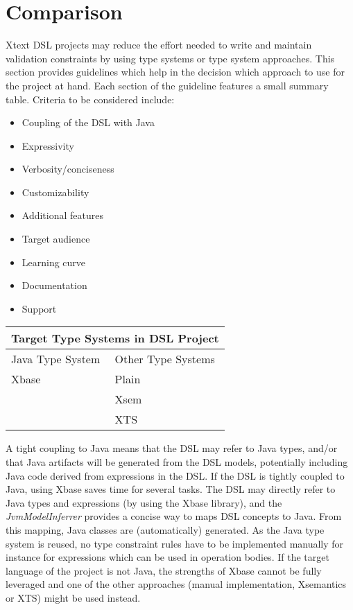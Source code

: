 \section{Comparison}

Xtext DSL projects may reduce the effort needed to write and maintain validation
constraints by using type systems or type system approaches. This section
provides guidelines which help in the decision which approach to use for the
project at hand. Each section of the guideline features a small summary
table. Criteria to be considered include:

  \begin{itemize}
    \item Coupling of the DSL with Java
    \item Expressivity
    \item Verbosity/conciseness
    \item Customizability
    \item Additional features
    \item Target audience
    \item Learning curve
    \item Documentation
    \item Support
  \end{itemize}

\begin{tabularx}{\linewidth}{ X   X }
\multicolumn{2}{c}{Target Type Systems in DSL Project} \\ \hline
Java Type System & Other Type Systems \\ \hline
Xbase & Plain  \\
& Xsem  \\
& XTS  \\
\end{tabularx}

A tight coupling to Java means that the DSL may refer to Java types, and/or that
Java artifacts will be generated from the DSL models, potentially including Java
code derived from expressions in the DSL. If the DSL is tightly coupled to Java,
using Xbase saves time for several tasks. The DSL may directly refer to Java
types and expressions (by using the Xbase library), and the
\emph{JvmModelInferrer} provides a concise way to maps DSL concepts to Java.
From this mapping, Java classes are (automatically) generated. As the Java type
system is reused, no type constraint rules have to be implemented manually for
instance for expressions which can be used in operation bodies. If the target
language of the project is not Java, the strengths of Xbase cannot be fully
leveraged and one of the other approaches (manual implementation, Xsemantics or
XTS) might be used instead.

